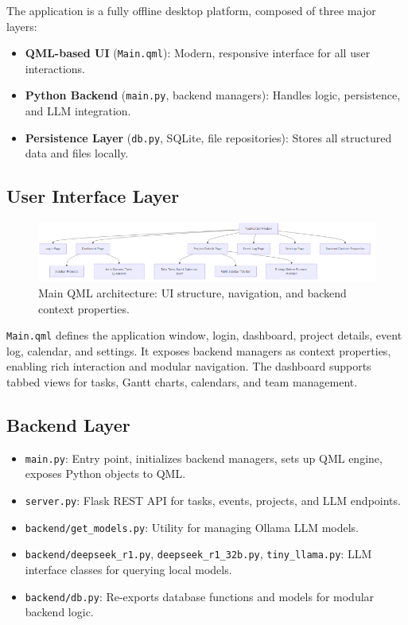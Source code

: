 \documentclass{report}
\begin{document}
The application is a fully offline desktop platform, composed of three major layers:
\begin{itemize}
    \item \textbf{QML-based UI} (\texttt{Main.qml}): Modern, responsive interface for all user interactions.
    \item \textbf{Python Backend} (\texttt{main.py}, backend managers): Handles logic, persistence, and LLM integration.
    \item \textbf{Persistence Layer} (\texttt{db.py}, SQLite, file repositories): Stores all structured data and files locally.
\end{itemize}

\subsection*{User Interface Layer}
\begin{figure}
\centering
\includegraphics[width=\linewidth,height=\textheight,keepaspectratio]{png_files/main_qml_architecture.png}
\caption{Main QML architecture: UI structure, navigation, and backend context properties.}
\end{figure}

\texttt{Main.qml} defines the application window, login, dashboard, project details, event log, calendar, and settings. It exposes backend managers as context properties, enabling rich interaction and modular navigation. The dashboard supports tabbed views for tasks, Gantt charts, calendars, and team management.

\subsection*{Backend Layer}
\begin{itemize}
    \item \texttt{main.py}: Entry point, initializes backend managers, sets up QML engine, exposes Python objects to QML.
    \item \texttt{server.py}: Flask REST API for tasks, events, projects, and LLM endpoints.
    \item \texttt{backend/get\_models.py}: Utility for managing Ollama LLM models.
    \item \texttt{backend/deepseek\_r1.py}, \texttt{deepseek\_r1\_32b.py}, \texttt{tiny\_llama.py}: LLM interface classes for querying local models.
    \item \texttt{backend/db.py}: Re-exports database functions and models for modular backend logic.
\end{itemize}
\end{document}
